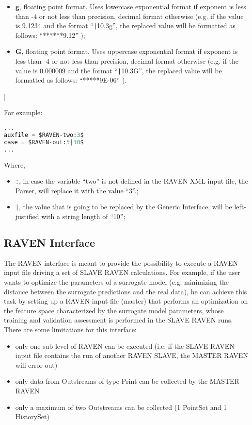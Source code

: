 \begin{itemize}
\begin{itemize}
      \item \textbf{g}, floating point format. Uses lowercase exponential format if exponent is less than -4 or not less than precision, decimal format otherwise (e.g. if the value is 9.1234 and the format ``\texttt{|}10.3g'', the replaced value will be formatted as follows: ``******9.12'' );
      \item \textbf{G}, floating point format. Uses uppercase exponential format if exponent is less than -4 or not less than precision, decimal format otherwise (e.g. if the value is 0.000009 and the format ``\texttt{|}10.3G'', the replaced value will be formatted as follows: ``*****9E-06'' ).
    \end{itemize}|
\end{itemize}
For example:
\begin{lstlisting}[language=python]
...
auxfile = $RAVEN-two:3$
case = $RAVEN-out:5|10$
...
\end{lstlisting}
Where,
\begin{itemize}
  \item  \texttt{:}, in case the variable ``two'' is not defined in the RAVEN XML input file, the Parser, will replace it with the value ``3''.;
  \item  \texttt{|}, the value that is going to be replaced by the Generic Interface, will be left- justified with a string length of ``10'';
\end{itemize}

\subsection{RAVEN Interface}
\label{subsec:RAVENInterface}
The RAVEN interface is meant to provide the possibility to execute a RAVEN input file
driving a set of SLAVE RAVEN calculations. For example, if the user wants to optimize the parameters
of a surrogate model (e.g. minimizing the distance between the surrogate predictions and the real data), he
can achieve this task by setting up  a RAVEN input file (master) that performs an optimization on the feature
space characterized by the surrogate model parameters, whose training and validation assessment  is performed in the SLAVE
RAVEN runs.
\\ There are some limitations for this interface:
\begin{itemize}
\item only one  sub-level of RAVEN can be executed (i.e. if the SLAVE RAVEN input file contains the run of another RAVEN SLAVE, the MASTER RAVEN will error out)
\item only data from Outstreams of type Print can be collected by the MASTER RAVEN
\item only a maximum of two Outstreams can be collected (1 PointSet and 1 HistorySet)
\end{itemize}


